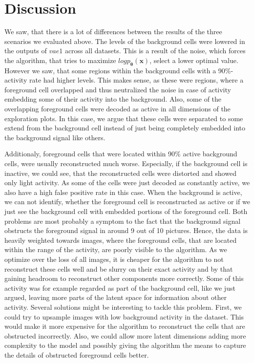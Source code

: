 \documentclass[12pt]{report}
\theoremstyle{definition}
\begin{document}
\section{Discussion}
We saw, that there is a lot of differences between the results of the three scenarios we evaluated above. 
The levels of the background cells were lowered in the outputs of $vae1$ across all datasets. This is a result of the noise, which forces the algorithm, that tries to maximize $log p_{\pmb{\theta}}(\mathbf{x})$, select a lower optimal value. However we saw, that some regions within the background cells with a 90\%-activity rate had higher levels. This makes sense, as these were regions, where a foreground cell overlapped and thus neutralized the noise in case of activity embedding some of their activity into the background. Also, some of the overlapping foreground cells were decoded as active in all dimensions of the exploration plots. In this case, we argue that these cells were separated to some extend from the background cell instead of just being completely embedded into the background signal like others.

Additionaly, foreground cells that were located within 90\% active background cells, were usually reconstructed much worse. Especially, if the background cell is inactive, we could see, that the reconstructed cells were distorted and showed only light activity. As some of the cells were just decoded as constantly active, we also have a high false positive rate in this case. When the background is active, we can not identify, whether the foreground cell is reconstructed as active or if we just see the background cell with embedded portions of the foreground cell.
Both problems are most probably a symptom to the fact that the background signal obstructs the foreground signal in around 9 out of 10 pictures. Hence, the data is heavily weighted towards images, where the foreground cells, that are located within the range of the activity, are poorly visible to the algorithm. As we optimize over the loss of all images, it is cheaper for the algorithm to not reconstruct these cells well and be slurry on their exact activity and by that gaining headroom to reconstruct other components more correctly. Some of this activity was for example regarded as part of the background cell, like we just argued, leaving more parts of the latent space for information about other activity. Several solutions might be interesting to tackle this problem. First, we could try to upsample images with low background activity in the dataset. This would make it more expensive for the algorithm to reconstruct the cells that are obstructed incorrectly. Also, we could allow more latent dimensions adding more complexity to the model and possibly giving the algorithm the means to capture the details of obstructed foreground cells better.
\end{document}
